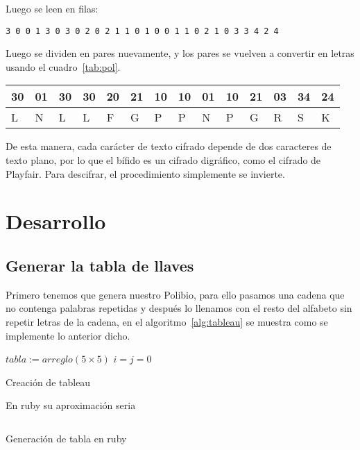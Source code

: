 \documentclass[onecolumn]{IEEEtran}
\begin{document}
Luego se leen en filas:
\begin{center}
  \texttt{3 0 0 1 3 0 3 0 2 0 2 1 1 0 1 0 0 1 1 0
    2 1 0 3 3 4 2 4 }
\end{center}

Luego se dividen en pares nuevamente, y los pares se vuelven a
convertir en letras usando el cuadro~\ref{tab:pol}.
\begin{table}[H]
  \centering{}
  \begin{tabular}{|l|l|l|l|l|l|l|l|l|l|l|l|l|l|}
\hline
30 & 01 & 30 & 30 & 20 & 21 & 10 & 10 & 01 & 10 & 21 & 03 & 34 & 24 \\ \hline
L & N & L & L & F & G & P & P & N & P & G & R & S & K \\ \hline
\end{tabular}
\end{table}

De esta manera, cada carácter de texto cifrado depende de dos caracteres de texto plano, por lo que el bífido es un cifrado digráfico, como el cifrado de Playfair. Para descifrar, el procedimiento simplemente se invierte.

\section{Desarrollo}\label{sec:desarrollo}

\subsection{Generar la tabla de llaves}\label{sec:generar-la-tabla}
Primero tenemos que genera nuestro Polibio, para ello pasamos una cadena
que no contenga palabras repetidas y después lo llenamos con el resto
del alfabeto sin repetir letras de la cadena, en el algoritmo~\ref{alg:tableau}
se muestra como se implemente lo anterior dicho.

\begin{algorithm}[H]
\SetAlgoLined{}
$tabla := arreglo(5 \times 5)$\;
$i = j = 0$\;
 \caption{Creación de tableau}\label{alg:tableau}
\end{algorithm}
\newpage{}
En ruby su aproximación seria
\begin{code}
  \inputminted[firstline=58, lastline=81]{ruby}{../program.rb}
  \caption{Generación de tabla en ruby}\label{lst:generar-la-tabla-1}
\end{code}
\end{document}
